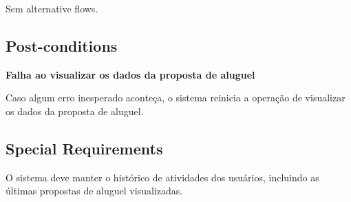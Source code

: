 Sem alternative flows.

\subsection*{Post-conditions}

\textbf{Falha ao visualizar os dados da proposta de aluguel}

Caso algum erro inesperado aconteça, o sistema reinicia a operação de visualizar os dados da
proposta de aluguel.

\subsection*{Special Requirements} 
O sistema deve manter o histórico de atividades dos usuários, incluindo as últimas propostas de
aluguel visualizadas.
